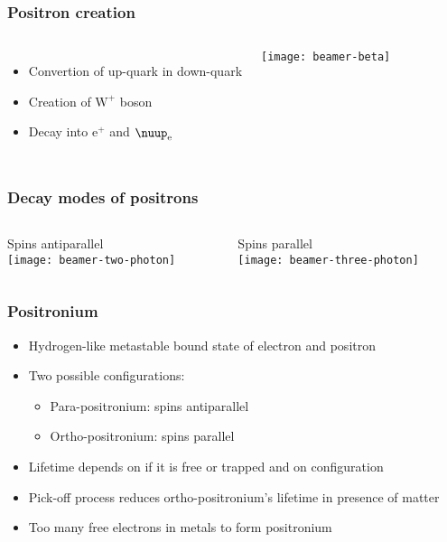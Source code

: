 \documentclass[english, fleqn]{beamer}
\begin{document}
\begin{frame}
    \frametitle{Positron creation}
    \begin{columns}[c]
        \begin{itemize}
            \item
                Convertion of up-quark in down-quark
            \item
                Creation of $\mathrm W^+$ boson
            \item
                Decay into $\mathrm e^+$ and $\nuup_\mathrm{e}$
        \end{itemize}
        \centering
        \texttt{[image: beamer-beta]}
    \end{columns}
\end{frame}

\begin{frame}
    \frametitle{Decay modes of positrons}

    \begin{columns}[T]
        \begin{column}{.5\textwidth}
            Spins antiparallel\\
            \vspace{1cm}
            \centering
            \texttt{[image: beamer-two-photon]}
        \end{column}
        \begin{column}{.5\textwidth}
            Spins parallel\\
            \centering
            \texttt{[image: beamer-three-photon]}
        \end{column}
    \end{columns}
\end{frame}

\begin{frame}
    \frametitle{Positronium}
    \begin{itemize}
        \item
            Hydrogen-like metastable bound state of electron and positron
        \pause
        \item
            Two possible configurations:
            \begin{itemize}
                \item
                    Para-positronium: spins antiparallel
                \item
                    Ortho-positronium: spins parallel
            \end{itemize}
        \pause
        \item
            Lifetime depends on if it is free or trapped and on configuration 
        \pause
        \item
            Pick-off process reduces ortho-positronium's lifetime in presence of matter
        \pause
        \item
            Too many free electrons in metals to form positronium
    \end{itemize}
\end{frame}
\end{document}
